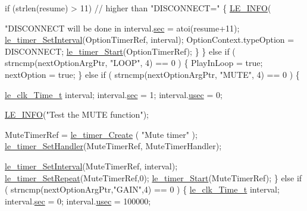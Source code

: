 \begin{DoxyCodeInclude}
{{{{{{{{{{{{{{            \textcolor{keywordflow}{if} (strlen(resume) > 11) \textcolor{comment}{// higher than "DISCONNECT="}
            \{
                \hyperlink{le__log_8h_a23e6d206faa64f612045d688cdde5808}{LE\_INFO}(\textcolor{stringliteral}{"DISCONNECT will be done in %
                interval.\hyperlink{structle__clk___time__t_ae28e527dbd551b3537edc1737611782f}{sec} = atoi(resume+11);
                \hyperlink{le__timer_8h_a0a103d5cef5e83fc9088859d527bbd43}{le\_timer\_SetInterval}(OptionTimerRef, interval);
                OptionContext.typeOption = DISCONNECT;
                \hyperlink{le__timer_8h_ada2ce7f8cb1e76ed959e323ae94bbfc0}{le\_timer\_Start}(OptionTimerRef);
            \}
        \}
        \textcolor{keywordflow}{else} \textcolor{keywordflow}{if} ( strncmp(nextOptionArgPtr, \textcolor{stringliteral}{"LOOP"}, 4) == 0 )
        \{
            PlayInLoop = \textcolor{keyword}{true};
            nextOption = \textcolor{keyword}{true};
        \}
        \textcolor{keywordflow}{else} \textcolor{keywordflow}{if} ( strncmp(nextOptionArgPtr, \textcolor{stringliteral}{"MUTE"}, 4) == 0 )
        \{

            \hyperlink{structle__clk___time__t}{le\_clk\_Time\_t} interval;
            interval.\hyperlink{structle__clk___time__t_ae28e527dbd551b3537edc1737611782f}{sec} = 1;
            interval.\hyperlink{structle__clk___time__t_a8324bdde9199a09a47489a3f246f184c}{usec} = 0;

            \hyperlink{le__log_8h_a23e6d206faa64f612045d688cdde5808}{LE\_INFO}(\textcolor{stringliteral}{"Test the MUTE function"});

            MuteTimerRef = \hyperlink{le__timer_8h_aee41169a210378b369f440cf99146522}{le\_timer\_Create}  ( \textcolor{stringliteral}{"Mute timer"} );
            \hyperlink{le__timer_8h_a8fb341f11e0da2692453df997613cb8e}{le\_timer\_SetHandler}(MuteTimerRef, MuteTimerHandler);

            \hyperlink{le__timer_8h_a0a103d5cef5e83fc9088859d527bbd43}{le\_timer\_SetInterval}(MuteTimerRef, interval);
            \hyperlink{le__timer_8h_a292b0a7d6dc0796a36a54fd04c6a7eeb}{le\_timer\_SetRepeat}(MuteTimerRef,0);
            \hyperlink{le__timer_8h_ada2ce7f8cb1e76ed959e323ae94bbfc0}{le\_timer\_Start}(MuteTimerRef);
        \}
        \textcolor{keywordflow}{else} \textcolor{keywordflow}{if} ( strncmp(nextOptionArgPtr,\textcolor{stringliteral}{"GAIN"},4) == 0 )
        \{
            \hyperlink{structle__clk___time__t}{le\_clk\_Time\_t} interval;
            interval.\hyperlink{structle__clk___time__t_ae28e527dbd551b3537edc1737611782f}{sec} = 0;
            interval.\hyperlink{structle__clk___time__t_a8324bdde9199a09a47489a3f246f184c}{usec} = 100000;

}}}}}}}}}}}}}}}
\end{DoxyCodeInclude}
